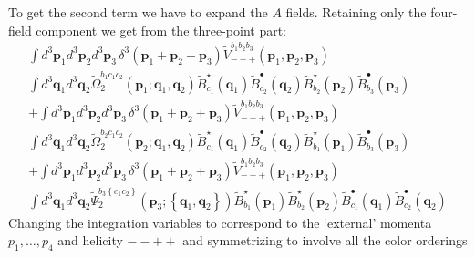 \documentclass[english,american]{article}
\begin{document}
To get the second term we have to expand the $A$ fields. Retaining
only the four-field component we get from the three-point part:
\begin{multline}
\int d^{3}\mathbf{p}_{1}d^{3}\mathbf{p}_{2}d^{3}\mathbf{p}_{3}\,\delta^{3}\left(\mathbf{p}_{1}+\mathbf{p}_{2}+\mathbf{p}_{3}\right)\tilde{V}_{--+}^{b_{1}b_{2}b_{3}}\left(\mathbf{p}_{1},\mathbf{p}_{2},\mathbf{p}_{3}\right)\,\\
\int d^{3}\mathbf{q}_{1}d^{3}\mathbf{q}_{2}\tilde{\Omega}_{2}^{b_{1}c_{1}c_{2}}\left(\mathbf{p}_{1};\mathbf{q}_{1},\mathbf{q}_{2}\right)\tilde{B}_{c_{1}}^{\star}\left(\mathbf{q}_{1}\right)\tilde{B}_{c_{2}}^{\bullet}\left(\mathbf{q}_{2}\right)\tilde{B}_{b_{2}}^{\star}\left(\mathbf{p}_{2}\right)\tilde{B}_{b_{3}}^{\bullet}\left(\mathbf{p}_{3}\right)\\
+\int d^{3}\mathbf{p}_{1}d^{3}\mathbf{p}_{2}d^{3}\mathbf{p}_{3}\,\delta^{3}\left(\mathbf{p}_{1}+\mathbf{p}_{2}+\mathbf{p}_{3}\right)\tilde{V}_{--+}^{b_{1}b_{2}b_{3}}\left(\mathbf{p}_{1},\mathbf{p}_{2},\mathbf{p}_{3}\right)\,\\
\int d^{3}\mathbf{q}_{1}d^{3}\mathbf{q}_{2}\tilde{\Omega}_{2}^{b_{2}c_{1}c_{2}}\left(\mathbf{p}_{2};\mathbf{q}_{1},\mathbf{q}_{2}\right)\tilde{B}_{c_{1}}^{\star}\left(\mathbf{q}_{1}\right)\tilde{B}_{c_{2}}^{\bullet}\left(\mathbf{q}_{2}\right)\tilde{B}_{b_{1}}^{\star}\left(\mathbf{p}_{1}\right)\tilde{B}_{b_{3}}^{\bullet}\left(\mathbf{p}_{3}\right)\\
+\int d^{3}\mathbf{p}_{1}d^{3}\mathbf{p}_{2}d^{3}\mathbf{p}_{3}\,\delta^{3}\left(\mathbf{p}_{1}+\mathbf{p}_{2}+\mathbf{p}_{3}\right)\tilde{V}_{--+}^{b_{1}b_{2}b_{3}}\left(\mathbf{p}_{1},\mathbf{p}_{2},\mathbf{p}_{3}\right)\\
\int d^{3}\mathbf{q}_{1}d^{3}\mathbf{q}_{2}\tilde{\Psi}_{2}^{b_{3}\left\{ c_{1}c_{2}\right\} }\left(\mathbf{p}_{3};\left\{ \mathbf{q}_{1},\mathbf{q}_{2}\right\} \right)\tilde{B}_{b_{1}}^{\star}\left(\mathbf{p}_{1}\right)\tilde{B}_{b_{2}}^{\star}\left(\mathbf{p}_{2}\right)\tilde{B}_{c_{1}}^{\bullet}\left(\mathbf{q}_{1}\right)\tilde{B}_{c_{2}}^{\bullet}\left(\mathbf{q}_{2}\right)
\end{multline}
Changing the integration variables to correspond to the `external' momenta
$p_{1},\dots,p_{4}$ and helicity $--++$ and symmetrizing to involve
all the color orderings 
\end{document}
